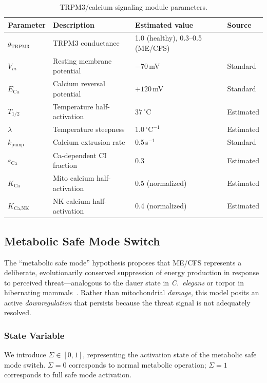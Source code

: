 \begin{table}[htbp]
\centering
\caption{TRPM3/calcium signaling module parameters.}
\label{tab:trpm3-parameters}
\begin{tabular}{llll}
\hline
Parameter & Description & Estimated value & Source \\
\hline
$g_{\text{TRPM3}}$ & TRPM3 conductance & 1.0 (healthy), 0.3--0.5 (ME/CFS) & ~\cite{Sasso2026trpm3} \\
$V_m$ & Resting membrane potential & $-70$\,mV & Standard \\
$E_{\text{Ca}}$ & Calcium reversal potential & $+120$\,mV & Standard \\
$T_{1/2}$ & Temperature half-activation & $37\,{}^{\circ}\text{C}$ & Estimated \\
$\lambda$ & Temperature steepness & 1.0\,${}^{\circ}\text{C}^{-1}$ & Estimated \\
$k_{\text{pump}}$ & Calcium extrusion rate & 0.5\,s$^{-1}$ & Standard \\
$\varepsilon_{\text{Ca}}$ & Ca-dependent CI fraction & 0.3 & Estimated \\
$K_{\text{Ca}}$ & Mito calcium half-activation & 0.5 (normalized) & Estimated \\
$K_{\text{Ca,NK}}$ & NK calcium half-activation & 0.4 (normalized) & Estimated \\
\hline
\end{tabular}
\end{table}

\subsection{Metabolic Safe Mode Switch}
\label{sec:safe-mode-model}

The ``metabolic safe mode'' hypothesis proposes that ME/CFS represents a deliberate, evolutionarily conserved suppression of energy production in response to perceived threat---analogous to the dauer state in \emph{C.\ elegans} or torpor in hibernating mammals~\cite{Naviaux2016metabolomics,Hrvatin2020torpor}. Rather than mitochondrial \emph{damage}, this model posits an active \emph{downregulation} that persists because the threat signal is not adequately resolved.

\subsubsection{State Variable}

We introduce $\Sigma \in [0, 1]$, representing the activation state of the metabolic safe mode switch. $\Sigma = 0$ corresponds to normal metabolic operation; $\Sigma = 1$ corresponds to full safe mode activation.

